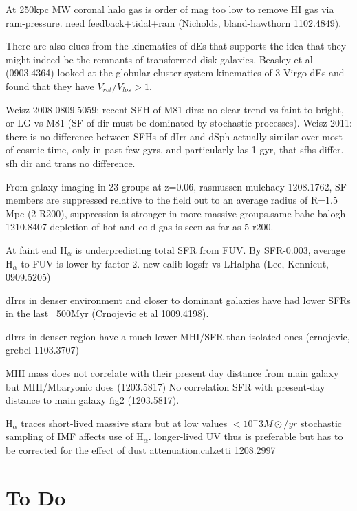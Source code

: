 \documentclass[12pt,preprint]{aastex}
\begin{document}
At 250kpc MW coronal halo gas is order of mag too low to remove HI gas via ram-pressure. need feedback+tidal+ram (Nicholds, bland-hawthorn 1102.4849).

There are also clues from the kinematics of dEs that supports the idea that they might indeed be the remnants of transformed disk galaxies. Beasley et al 
(0903.4364) looked at the globular cluster system kinematics of 3 Virgo dEs and found that they have $V_{rot}/V_{los} > 1$.

Weisz 2008 0809.5059: recent SFH of M81 dirs: no clear trend vs faint to bright, or LG vs M81 (SF of dir must be dominated by stochastic processes).
Weisz 2011: there is no difference between SFHs of dIrr and dSph actually similar over most of cosmic time, only in past few gyrs, and particularly las 1 gyr, 
that sfhs differ. sfh dir and trans no difference.

From galaxy imaging in 23 groups at z=0.06, rasmussen mulchaey 1208.1762, SF members are suppressed relative to the field out to an average radius of 
R=1.5 Mpc (2 R200), suppression is stronger in more massive groups.same bahe balogh 1210.8407 depletion of hot and cold gas is seen as far as 5 r200.

At faint end H$_\alpha$ is underpredicting total SFR from FUV. By SFR-0.003, average H$_\alpha$ to FUV is lower by factor 2. new calib logsfr vs LHalpha 
(Lee, Kennicut, 0909.5205)

dIrrs in denser environment and closer to dominant galaxies have had lower SFRs in the last ~500Myr (Crnojevic et al 1009.4198).

dIrrs in denser region have a much lower MHI/SFR than isolated ones (crnojevic, grebel 1103.3707)

MHI mass does not correlate with their present day distance from main galaxy but MHI/Mbaryonic does (1203.5817)
No correlation SFR with present-day distance to main galaxy fig2 (1203.5817).

H$_\alpha$ traces short-lived massive stars but at low values $<10^-3 M\odot/yr$ stochastic sampling of IMF affects use of H$_\alpha$. longer-lived UV thus 
is preferable but has to be corrected for the effect of dust attenuation.calzetti 1208.2997



\section{To Do}
\end{document}
